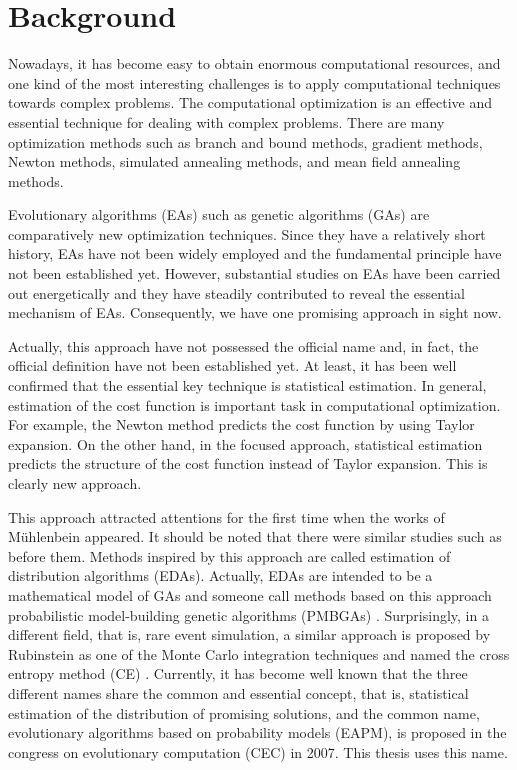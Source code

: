 \section{Background}
Nowadays, 
it has become easy to obtain  enormous computational resources, and
one kind of the most interesting challenges is
to apply computational techniques towards complex problems.
The computational optimization is  
an effective and essential technique for dealing with complex problems.
There are many optimization methods such as
branch and bound methods, gradient methods, Newton methods, simulated
annealing methods, and mean field annealing methods.

 
Evolutionary algorithms (EAs) such as genetic algorithms (GAs) 
\cite{goldberg:ga,weise:go}
are comparatively new optimization techniques.
Since they have a relatively short history,
EAs have not been widely employed and 
the fundamental principle have not been established yet.
However, substantial studies on EAs have been carried out energetically
and they have steadily contributed to reveal
the essential mechanism of EAs.
Consequently, we have one promising approach in sight now.


Actually, this approach have not possessed the official name and, 
in fact, the official definition have not been established yet.
At least, it has been well confirmed that 
the essential key technique is statistical estimation.
In general, estimation of the cost function is 
important task in computational optimization.
For example, the Newton method predicts
the cost function by using Taylor expansion.
On the other hand, in the focused approach,
statistical estimation predicts the structure of 
the cost function instead of Taylor expansion.
This is clearly new approach.


This approach attracted attentions for the first time
when the works of M\"{u}hlenbein
\cite{muhlenbein:umda,muhlenbein:umda_c}
appeared.
It should be noted that there were similar studies such as
\cite{baluja:pbil} before them.
Methods inspired by this approach are called
estimation of distribution algorithms (EDAs). 
Actually, 
EDAs are intended to be a mathematical model of GAs
and someone call methods based on this approach
probabilistic model-building genetic algorithms (PMBGAs)
\cite{pelikan:pmbga}.
Surprisingly, in a different field, that is, rare event simulation,
a similar approach is proposed by Rubinstein 
as one of the Monte Carlo integration techniques and
named the cross entropy method (CE) \cite{rubinstein:ce}.
Currently, 
it has become well known that
the three different names share the common and essential
concept, that is, statistical estimation of the distribution of
promising solutions, 
and the common name, evolutionary algorithms based on probability models
(EAPM), is proposed 
in the congress on evolutionary computation (CEC) in 2007.
This thesis uses this name.

